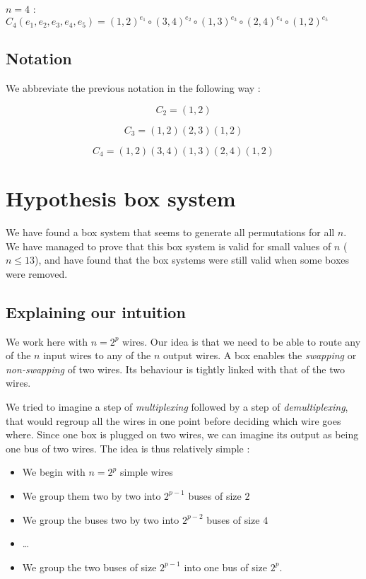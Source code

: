 \documentclass[11pt, a4paper]{article}
\begin{document}
$n=4$ : $C_4(e_1,e_2,e_3,e_4,e_5) = (1, 2)^{e_1} \circ (3,4)^{e_2} \circ
(1,3)^{e_3} \circ (2, 4)^{e_4} \circ (1,2)^{e_5}$

\subsection {Notation}

We abbreviate the previous notation in the following way :

$$C_2 = (1,2)$$

$$C_3 = (1,2)(2,3)(1,2)$$

$$C_4 = (1,2)(3,4)(1,3)(2,4)(1,2)$$

\section{Hypothesis box system}

We have found a box system that seems to generate all permutations for all $n$.
We have managed to prove that this box system is valid for small values of $n$
($n \leq 13$), and have found that the box systems were still valid when some
boxes were removed.

\subsection{Explaining our intuition}

We work here with $n = 2^p$ wires. Our idea is that we need to be able to route
any of the $n$ input wires to any of the $n$ output wires. A box enables the
{\em swapping} or {\em non-swapping} of two wires. Its behaviour is tightly
linked with that of the two wires.

We tried to imagine a step of {\em multiplexing} followed by a step of {\em
demultiplexing}, that would regroup all the wires in one point before deciding
which wire goes where. Since one box is plugged on two wires, we can imagine its
output as being one bus of two wires. The idea is thus relatively simple :

\begin{itemize}
	\item We begin with $n = 2^p$ simple wires
	\item We group them two by two into $2^{p-1}$ buses of size $2$
	\item We group the buses two by two into $2^{p-2}$ buses of size $4$
	\item \dots
	\item We group the two buses of size $2^{p-1}$ into one bus of size $2^p$.
\end{itemize}
\end{document}
